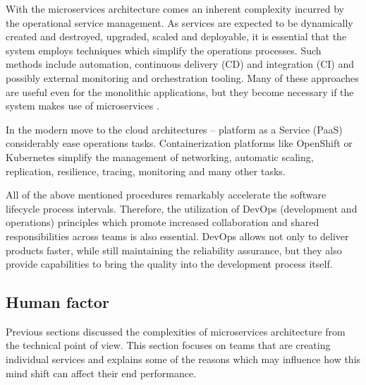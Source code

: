 \documentclass[oneside,
  digital, %
  table,   %
  lof,     %
  lot,     %
]{fithesis3}
\begin{document}
With the microservices architecture comes an inherent complexity incurred by the operational service management. As services are expected to be dynamically created and destroyed, upgraded, scaled and deployable, it is essential that the system employs techniques which simplify the operations processes. Such methods include automation, continuous delivery (CD) and integration (CI) and possibly external monitoring and orchestration tooling. Many of these approaches are useful even for the monolithic applications, but they become necessary if the system makes use of microservices \cite{ms_tradeoffs}.

In the modern move to the cloud architectures -- platform as a Service (PaaS) considerably ease operations tasks. Containerization platforms like OpenShift \cite{openshift} or Kubernetes \cite{kubernetes} simplify the management of networking, automatic scaling, replication, resilience, tracing, monitoring and many other tasks.

All of the above mentioned procedures remarkably accelerate the software lifecycle process intervals. Therefore, the utilization of DevOps \cite{devops} (development and operations) principles which promote increased collaboration and shared responsibilities across teams is also essential. DevOps allows not only to deliver products faster, while still maintaining the reliability assurance, but they also provide capabilities to bring the quality into the development process itself.

\subsection{Human factor}

Previous sections discussed the complexities of microservices architecture from the technical point of view. This section focuses on teams that are creating individual services and explains some of the reasons which may influence how this mind shift can affect their end performance.
\end{document}
